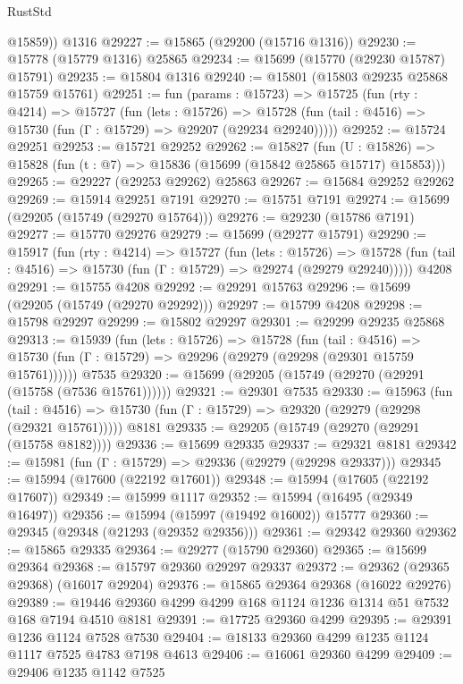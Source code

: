 \begin{lexlean}{RustStd}
\begin{coremodule}
        @15859))
    @1316
@29227 := @15865 (@29200 (@15716 @1316))
@29230 := @15778 (@15779 @1316) @25865
@29234 := @15699 (@15770 (@29230 @15787) @15791)
@29235 := @15804 @1316
@29240 := @15801 (@15803 @29235 @25868 @15759 @15761)
@29251 := fun (params : @15723) =>
  @15725
    (fun (rty : @4214) =>
    @15727
      (fun (lets : @15726) =>
      @15728 (fun (tail : @4516) => @15730 (fun (Γ : @15729) => @29207 (@29234 @29240)))))
@29252 := @15724 @29251
@29253 := @15721 @29252
@29262 := @15827
    (fun (U : @15826) => @15828 (fun (t : @7) => @15836 (@15699 (@15842 @25865 @15717) @15853)))
@29265 := @29227 (@29253 @29262) @25863
@29267 := @15684 @29252 @29262
@29269 := @15914 @29251 @7191
@29270 := @15751 @7191
@29274 := @15699 (@29205 (@15749 (@29270 @15764)))
@29276 := @29230 (@15786 @7191)
@29277 := @15770 @29276
@29279 := @15699 (@29277 @15791)
@29290 := @15917
    (fun (rty : @4214) =>
    @15727
      (fun (lets : @15726) =>
      @15728 (fun (tail : @4516) => @15730 (fun (Γ : @15729) => @29274 (@29279 @29240)))))
    @4208
@29291 := @15755 @4208
@29292 := @29291 @15763
@29296 := @15699 (@29205 (@15749 (@29270 @29292)))
@29297 := @15799 @4208
@29298 := @15798 @29297
@29299 := @15802 @29297
@29301 := @29299 @29235 @25868
@29313 := @15939
    (fun (lets : @15726) =>
    @15728
      (fun (tail : @4516) =>
      @15730 (fun (Γ : @15729) => @29296 (@29279 (@29298 (@29301 @15759 @15761))))))
    @7535
@29320 := @15699 (@29205 (@15749 (@29270 (@29291 (@15758 (@7536 @15761))))))
@29321 := @29301 @7535
@29330 := @15963
    (fun (tail : @4516) => @15730 (fun (Γ : @15729) => @29320 (@29279 (@29298 (@29321 @15761)))))
    @8181
@29335 := @29205 (@15749 (@29270 (@29291 (@15758 @8182))))
@29336 := @15699 @29335
@29337 := @29321 @8181
@29342 := @15981 (fun (Γ : @15729) => @29336 (@29279 (@29298 @29337)))
@29345 := @15994 (@17600 (@22192 @17601))
@29348 := @15994 (@17605 (@22192 @17607))
@29349 := @15999 @1117
@29352 := @15994 (@16495 (@29349 @16497))
@29356 := @15994 (@15997 (@19492 @16002)) @15777
@29360 := @29345 (@29348 (@21293 (@29352 @29356)))
@29361 := @29342 @29360
@29362 := @15865 @29335
@29364 := @29277 (@15790 @29360)
@29365 := @15699 @29364
@29368 := @15797 @29360 @29297 @29337
@29372 := @29362 (@29365 @29368) (@16017 @29204)
@29376 := @15865 @29364 @29368 (@16022 @29276)
@29389 := @19446 @29360 @4299 @4299 @168 @1124 @1236 @1314 @51 @7532 @168 @7194 @4510 @8181
@29391 := @17725 @29360 @4299
@29395 := @29391 @1236 @1124 @7528 @7530
@29404 := @18133 @29360 @4299 @1235 @1124 @1117 @7525 @4783 @7198 @4613
@29406 := @16061 @29360 @4299
@29409 := @29406 @1235 @1142 @7525

\end{coremodule}
\end{lexlean}
